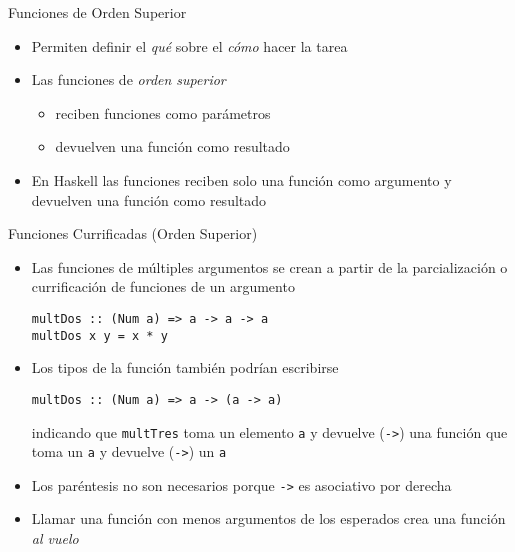 \begin{frame}[fragile]{Funciones de Orden Superior}
    \begin{itemize}
        \item Permiten definir el \emph{qué} sobre el \emph{cómo} hacer la tarea
        \item Las funciones de \emph{orden superior}
        \begin{itemize}
            \item reciben funciones como parámetros
            \item devuelven una función como resultado
        \end{itemize}
        \item En Haskell las funciones reciben solo una función como argumento y devuelven una función como resultado
    \end{itemize}
\end{frame}

\begin{frame}[fragile]{Funciones Currificadas (Orden Superior)}
    \begin{itemize}
        \item Las funciones de múltiples argumentos se crean a partir de la parcialización o currificación de funciones de un argumento
        \begin{lstlisting}[style=consola]
multDos :: (Num a) => a -> a -> a
multDos x y = x * y
        \end{lstlisting}
        \item Los tipos de la función también podrían escribirse
        \begin{lstlisting}[style=consola]
multDos :: (Num a) => a -> (a -> a)
        \end{lstlisting}
        indicando que \verb|multTres| toma un elemento \verb|a| y devuelve (\verb|->|) una función que toma un \verb|a| y devuelve (\verb|->|) un \verb|a|
        \item Los paréntesis no son necesarios porque \verb|->| es asociativo por derecha
        \item Llamar una función con menos argumentos de los esperados crea una función \emph{al vuelo}
    \end{itemize}
\end{frame}

